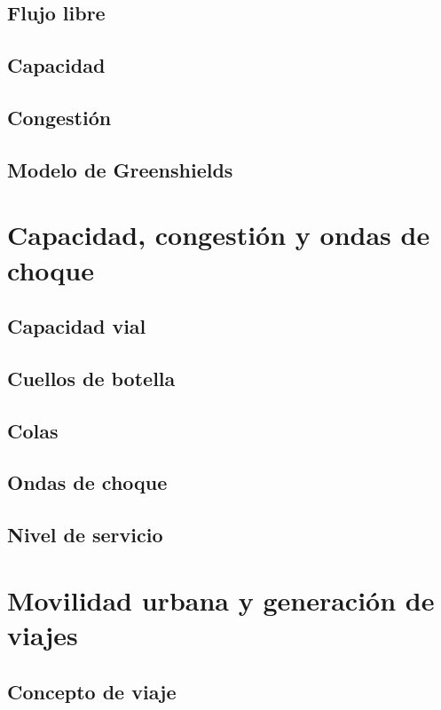 \subsection{Flujo libre}

\subsection{Capacidad}

\subsection{Congestión}

\subsection{Modelo de Greenshields}

\section{Capacidad, congestión y ondas de choque}

\subsection{Capacidad vial}

\subsection{Cuellos de botella}

\subsection{Colas}

\subsection{Ondas de choque}

\subsection{Nivel de servicio}

\section{Movilidad urbana y generación de viajes}

\subsection{Concepto de viaje}

